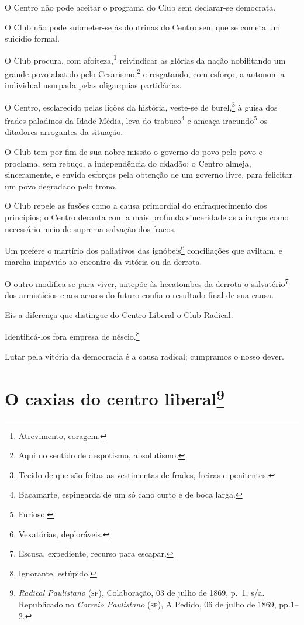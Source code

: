 O Centro não pode aceitar o programa do Club sem declarar-se democrata.

O Club não pode submeter-se às doutrinas do Centro sem que se cometa um
suicídio formal.

O Club procura, com afoiteza,\footnote{Atrevimento, coragem.}
reivindicar as glórias da nação nobilitando um grande povo abatido pelo
Cesarismo,\footnote{Aqui no sentido de despotismo, absolutismo.} e
resgatando, com esforço, a autonomia individual usurpada pelas
oligarquias partidárias.

O Centro, esclarecido pelas lições da história, veste-se de
burel,\footnote{Tecido de que são feitas as vestimentas de frades,
  freiras e penitentes.} à guisa dos frades paladinos da Idade Média,
leva do trabuco\footnote{Bacamarte, espingarda de um só cano curto e
  de boca larga.} e ameaça iracundo\footnote{Furioso.} os ditadores
arrogantes da situação.

O Club tem por fim de sua nobre missão o governo do povo pelo povo e
proclama, sem rebuço, a independência do cidadão; o Centro almeja,
sinceramente, e envida esforços pela obtenção de um governo livre, para
felicitar um povo degradado pelo trono.

O Club repele as fusões como a causa primordial do enfraquecimento dos
princípios; o Centro decanta com a mais profunda sinceridade as alianças
como necessário meio de suprema salvação dos fracos.

Um prefere o martírio dos paliativos das ignóbeis\footnote{Vexatórias,
  deploráveis.} conciliações que aviltam, e marcha impávido ao encontro
da vitória ou da derrota.

O outro modifica-se para viver, antepõe às hecatombes da derrota o
salvatério\footnote{Escusa, expediente, recurso para escapar.} dos
armistícios e aos acasos do futuro confia o resultado final de sua
causa.

Eis a diferença que distingue do Centro Liberal o Club Radical.

Identificá-los fora empresa de néscio.\footnote{Ignorante, estúpido.}

Lutar pela vitória da democracia é a causa radical; cumpramos o nosso
dever.

\chapter{O caxias do centro liberal\footnote{\emph{Radical Paulistano}
  (\textsc{sp}), Colaboração, 03 de julho de 1869, p.~1, s/a. Republicado no \emph{Correio
  Paulistano} (\textsc{sp}), A Pedido, 06 de julho de 1869, pp.1--2.}}

